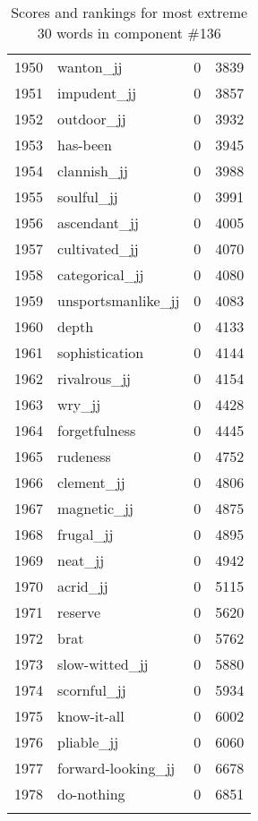 \begin{longtable}[!htbp]{| rlr@{.}l |}
    1950 & wanton\_jj & 0 & 3839 \\
    1951 & impudent\_jj & 0 & 3857 \\
    1952 & outdoor\_jj & 0 & 3932 \\
    1953 & has-been & 0 & 3945 \\
    1954 & clannish\_jj & 0 & 3988 \\
    1955 & soulful\_jj & 0 & 3991 \\
    1956 & ascendant\_jj & 0 & 4005 \\
    1957 & cultivated\_jj & 0 & 4070 \\
    1958 & categorical\_jj & 0 & 4080 \\
    1959 & unsportsmanlike\_jj & 0 & 4083 \\
    1960 & depth & 0 & 4133 \\
    1961 & sophistication & 0 & 4144 \\
    1962 & rivalrous\_jj & 0 & 4154 \\
    1963 & wry\_jj & 0 & 4428 \\
    1964 & forgetfulness & 0 & 4445 \\
    1965 & rudeness & 0 & 4752 \\
    1966 & clement\_jj & 0 & 4806 \\
    1967 & magnetic\_jj & 0 & 4875 \\
    1968 & frugal\_jj & 0 & 4895 \\
    1969 & neat\_jj & 0 & 4942 \\
    1970 & acrid\_jj & 0 & 5115 \\
    1971 & reserve & 0 & 5620 \\
    1972 & brat & 0 & 5762 \\
    1973 & slow-witted\_jj & 0 & 5880 \\
    1974 & scornful\_jj & 0 & 5934 \\
    1975 & know-it-all & 0 & 6002 \\
    1976 & pliable\_jj & 0 & 6060 \\
    1977 & forward-looking\_jj & 0 & 6678 \\
    1978 & do-nothing & 0 & 6851 \\
    \hline
    \caption{Scores and rankings for most extreme 30 words in component \#136} \\
\end{longtable}
